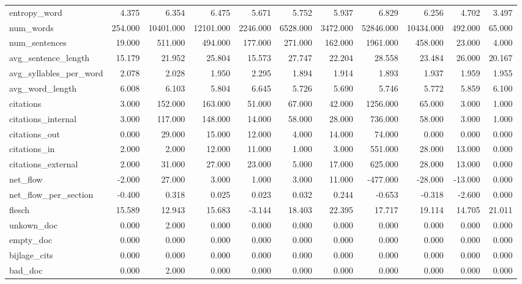 \begin{tabular}{lrrrrrrrrrr}
\cline{1-11}
entropy\_word & 4.375 & 6.354 & 6.475 & 5.671 & 5.752 & 5.937 & 6.829 & 6.256 & 4.702 & 3.497 \\
\cline{1-11}
num\_words & 254.000 & 10401.000 & 12101.000 & 2246.000 & 6528.000 & 3472.000 & 52846.000 & 10434.000 & 492.000 & 65.000 \\
\cline{1-11}
num\_sentences & 19.000 & 511.000 & 494.000 & 177.000 & 271.000 & 162.000 & 1961.000 & 458.000 & 23.000 & 4.000 \\
\cline{1-11}
avg\_sentence\_length & 15.179 & 21.952 & 25.804 & 15.573 & 27.747 & 22.204 & 28.558 & 23.484 & 26.000 & 20.167 \\
\cline{1-11}
avg\_syllables\_per\_word & 2.078 & 2.028 & 1.950 & 2.295 & 1.894 & 1.914 & 1.893 & 1.937 & 1.959 & 1.955 \\
\cline{1-11}
avg\_word\_length & 6.008 & 6.103 & 5.804 & 6.645 & 5.726 & 5.690 & 5.746 & 5.772 & 5.859 & 6.100 \\
\cline{1-11}
citations & 3.000 & 152.000 & 163.000 & 51.000 & 67.000 & 42.000 & 1256.000 & 65.000 & 3.000 & 1.000 \\
\cline{1-11}
citations\_internal & 3.000 & 117.000 & 148.000 & 14.000 & 58.000 & 28.000 & 736.000 & 58.000 & 3.000 & 1.000 \\
\cline{1-11}
citations\_out & 0.000 & 29.000 & 15.000 & 12.000 & 4.000 & 14.000 & 74.000 & 0.000 & 0.000 & 0.000 \\
\cline{1-11}
citations\_in & 2.000 & 2.000 & 12.000 & 11.000 & 1.000 & 3.000 & 551.000 & 28.000 & 13.000 & 0.000 \\
\cline{1-11}
citations\_external & 2.000 & 31.000 & 27.000 & 23.000 & 5.000 & 17.000 & 625.000 & 28.000 & 13.000 & 0.000 \\
\cline{1-11}
net\_flow & -2.000 & 27.000 & 3.000 & 1.000 & 3.000 & 11.000 & -477.000 & -28.000 & -13.000 & 0.000 \\
\cline{1-11}
net\_flow\_per\_section & -0.400 & 0.318 & 0.025 & 0.023 & 0.032 & 0.244 & -0.653 & -0.318 & -2.600 & 0.000 \\
\cline{1-11}
flesch & 15.589 & 12.943 & 15.683 & -3.144 & 18.403 & 22.395 & 17.717 & 19.114 & 14.705 & 21.011 \\
\cline{1-11}
unkown\_doc & 0.000 & 2.000 & 0.000 & 0.000 & 0.000 & 0.000 & 0.000 & 0.000 & 0.000 & 0.000 \\
\cline{1-11}
empty\_doc & 0.000 & 0.000 & 0.000 & 0.000 & 0.000 & 0.000 & 0.000 & 0.000 & 0.000 & 0.000 \\
\cline{1-11}
bijlage\_cits & 0.000 & 0.000 & 0.000 & 0.000 & 0.000 & 0.000 & 0.000 & 0.000 & 0.000 & 0.000 \\
\cline{1-11}
bad\_doc & 0.000 & 2.000 & 0.000 & 0.000 & 0.000 & 0.000 & 0.000 & 0.000 & 0.000 & 0.000 \\
\cline{1-11}
\bottomrule
\end{tabular}

